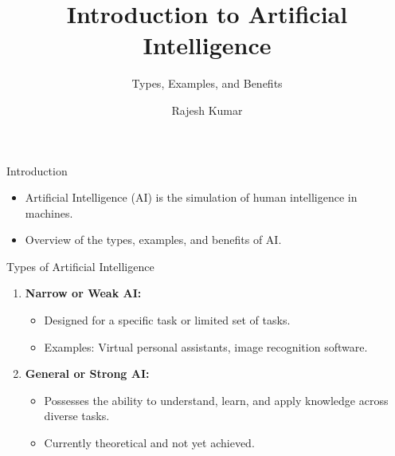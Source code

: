 
\title{Introduction to Artificial Intelligence}
\subtitle{Types, Examples, and Benefits}
\author{Rajesh Kumar}
\date{}


\begin{frame}
  \titlepage
\end{frame}

\begin{frame}{Introduction}
  \begin{itemize}
    \item Artificial Intelligence (AI) is the simulation of human intelligence in machines.
    \item Overview of the types, examples, and benefits of AI.
  \end{itemize}
\end{frame}

\begin{frame}{Types of Artificial Intelligence}
  \begin{enumerate}
    \item \textbf{Narrow or Weak AI:}
      \begin{itemize}
        \item Designed for a specific task or limited set of tasks.
        \item Examples: Virtual personal assistants, image recognition software.
      \end{itemize}
    \item \textbf{General or Strong AI:}
      \begin{itemize}
        \item Possesses the ability to understand, learn, and apply knowledge across diverse tasks.
        \item Currently theoretical and not yet achieved.
      \end{itemize}
  \end{enumerate}
\end{frame}

